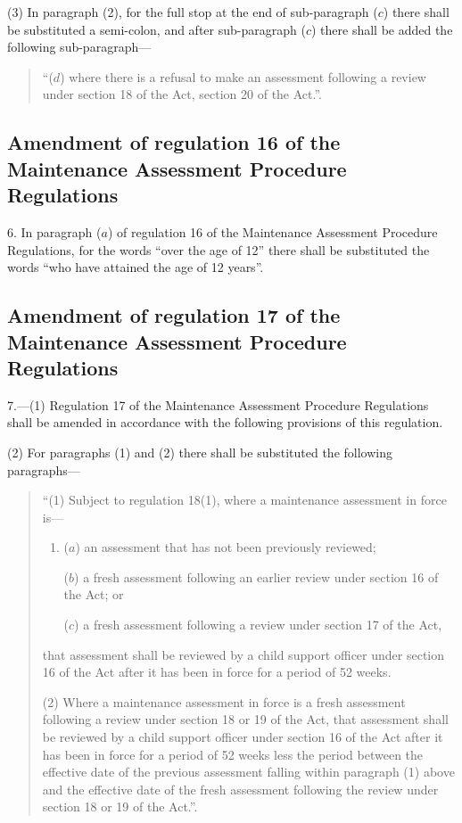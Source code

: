 \documentclass[a4paper]{article}
\begin{document}
(3) In paragraph (2), for the full stop at the end of sub-paragraph ($c$) there shall be substituted a semi-colon, and after sub-paragraph ($c$) there shall be added the following sub-paragraph---
\begin{quotation}
“($d$) where there is a refusal to make an assessment following a review under section 18 of the Act, section 20 of the Act.”.
\end{quotation}

\subsection[6. Amendment of regulation 16 of the Maintenance Assessment Procedure Regulations]{Amendment of regulation 16 of the Maintenance Assessment Procedure Regulations}

6.  In paragraph ($a$) of regulation 16 of the Maintenance Assessment Procedure Regulations, for the words “over the age of 12” there shall be substituted the words “who have attained the age of 12 years”.

\subsection[7. Amendment of regulation 17 of the Maintenance Assessment Procedure Regulations]{Amendment of regulation 17 of the Maintenance Assessment Procedure Regulations}

7.—(1) Regulation 17 of the Maintenance Assessment Procedure Regulations shall be amended in accordance with the following provisions of this regulation.

(2) For paragraphs (1) and (2) there shall be substituted the following paragraphs---
\begin{quotation}
“(1) Subject to regulation 18(1), where a maintenance assessment in force is---
\begin{enumerate}\item[]
($a$) an assessment that has not been previously reviewed;

($b$) a fresh assessment following an earlier review under section 16 of the Act; or

($c$) a fresh assessment following a review under section 17 of the Act,
\end{enumerate}
that assessment shall be reviewed by a child support officer under section 16 of the Act after it has been in force for a period of 52 weeks.

(2) Where a maintenance assessment in force is a fresh assessment following a review under section 18 or 19 of the Act, that assessment shall be reviewed by a child support officer under section 16 of the Act after it has been in force for a period of 52 weeks less the period between the effective date of the previous assessment falling within paragraph (1) above and the effective date of the fresh assessment following the review under section 18 or 19 of the Act.”.
\end{quotation}
\end{document}
